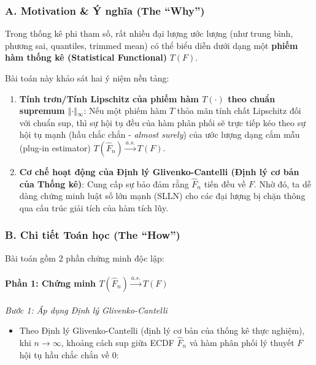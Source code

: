 \documentclass[12pt,a4paper]{article}
\begin{document}
\subsubsection{A. Motivation \& Ý nghĩa (The ``Why'')}\label{a.-motivation-uxfd-nghux129a-the-why-4}

Trong thống kê phi tham số, rất nhiều đại lượng ước lượng (như trung bình, phương sai, quantiles, trimmed mean) có thể biểu diễn dưới dạng một \textbf{phiếm hàm thống kê (Statistical Functional)} \(T(F)\).

Bài toán này khảo sát hai ý niệm nền tảng:

\begin{enumerate}
\def\labelenumi{\arabic{enumi}.}

\item
  \textbf{Tính trơn/Tính Lipschitz của phiếm hàm \(T(\cdot)\) theo chuẩn supremum \(\Vert{}\cdot\Vert{}_\infty\)}: Nếu một phiếm hàm \(T\) thỏa mãn tính chất Lipschitz đối với chuẩn sup, thì sự hội tụ đều của hàm phân phối sẽ trực tiếp kéo theo sự hội tụ mạnh (hầu chắc chắn - \emph{almost surely}) của ước lượng dạng cắm mẫu (plug-in estimator) \(T(\widehat{F}_n) \xrightarrow{a.s.} T(F)\).
\item
  \textbf{Cơ chế hoạt động của Định lý Glivenko-Cantelli (Định lý cơ bản của Thống kê)}: Cung cấp sự bảo đảm rằng \(\widehat{F}_n\) tiến đều về \(F\). Nhờ đó, ta dễ dàng chứng minh luật số lớn mạnh (SLLN) cho các đại lượng bị chặn thông qua cấu trúc giải tích của hàm tích lũy.
\end{enumerate}

\subsubsection{B. Chi tiết Toán học (The ``How'')}\label{b.-chi-tiux1ebft-touxe1n-hux1ecdc-the-how-4}

Bài toán gồm 2 phần chứng minh độc lập:

\paragraph{\texorpdfstring{Phần 1: Chứng minh \(T(\widehat{F}_n) \xrightarrow{a.s.} T(F)\)}{Phần 1: Chứng minh T(\textbackslash widehat\{F\}\_n) \textbackslash xrightarrow\{a.s.\} T(F)}}\label{phux1ea7n-1-chux1ee9ng-minh-twidehatf_n-xrightarrowa.s.-tf}

\emph{Bước 1: Áp dụng Định lý Glivenko-Cantelli}

\begin{itemize}

\item
  Theo Định lý Glivenko-Cantelli (định lý cơ bản của thống kê thực nghiệm), khi \(n \to \infty\), khoảng cách sup giữa ECDF \(\widehat{F}_n\) và hàm phân phối lý thuyết \(F\) hội tụ hầu chắc chắn về 0:
\end{itemize}
\end{document}
